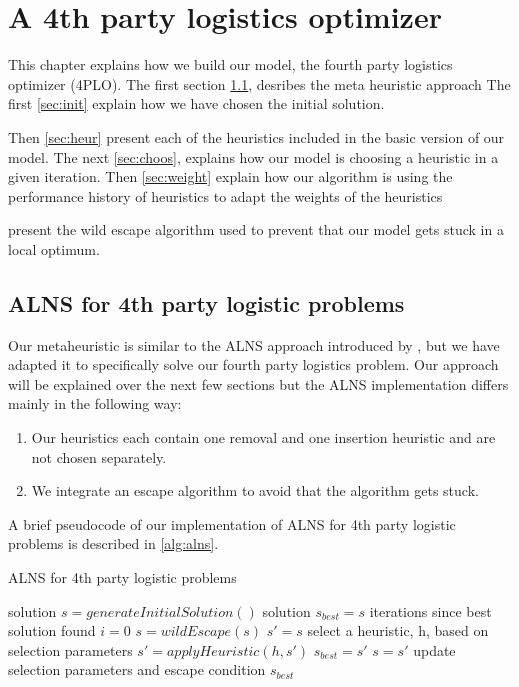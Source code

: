 \documentclass[../main.tex]{subfiles}
\begin{document}
                                                
\chapter{A 4th party logistics optimizer}
\label{ch:appr}
This chapter explains how we build our model, the fourth party logistics optimizer (4PLO).
The first section \cref{sec:alns}, desribes the meta heuristic approach 
The first \cref{sec:init} explain how we have chosen the initial solution.\par
Then \cref{sec:heur} present each of the heuristics included in the basic version of our model.
The next \cref{sec:choos}, explains how our model is choosing a heuristic in a given iteration. 
Then \cref{sec:weight} explain how our algorithm is using the performance history of heuristics to adapt the weights of the heuristics 

 present the wild escape algorithm used to prevent that our model gets stuck in a local optimum.

\section{ALNS for 4th party logistic problems}
\label{sec:alns}
Our metaheuristic is similar to the ALNS approach introduced by \cite{ropke06}, but we have adapted it to specifically solve our fourth party logistics problem. 
Our approach will be explained over the next few sections but the ALNS implementation differs mainly in the following way:
\begin{enumerate}
    \item Our heuristics each contain one removal and one insertion heuristic and are not chosen separately. 
    \item We integrate an escape algorithm to avoid that the algorithm gets stuck.
\end{enumerate}

A brief pseudocode of our implementation of ALNS for 4th party logistic problems is described in \cref{alg:alns}.  

\begin{algorithm}
    \caption{ALNS for 4th party logistic problems}\label{alg:alns}
    \begin{algorithmic}[1]
        \State solution $s = generateInitialSolution()$
        \State solution $s_{best} = s$
        \State iterations since best solution found $i=0$
        \Repeat
                \State $s = wildEscape(s)$ 
            \EndIf
            \State $s' = s$
            \State select a heuristic, h, based on selection parameters
            \State $s' = applyHeuristic(h,s')$
                \State $s_{best}=s'$
            \EndIf
                \State $s = s'$
            \EndIf
            \State update selection parameters and escape condition
        \State
        \Return $s_{best}$
        \EndFunction
    \end{algorithmic}
\end{algorithm}
\end{document}
